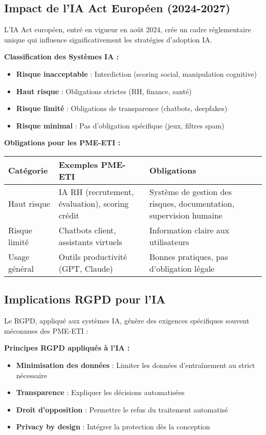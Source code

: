 \subsection{Impact de l'IA Act Européen (2024-2027)}

L'IA Act européen, entré en vigueur en août 2024, crée un cadre réglementaire unique qui influence significativement les stratégies d'adoption IA.

\textbf{Classification des Systèmes IA :}
\begin{itemize}
    \item \textbf{Risque inacceptable} : Interdiction (scoring social, manipulation cognitive)
    \item \textbf{Haut risque} : Obligations strictes (RH, finance, santé)
    \item \textbf{Risque limité} : Obligations de transparence (chatbots, deepfakes)
    \item \textbf{Risque minimal} : Pas d'obligation spécifique (jeux, filtres spam)
\end{itemize}

\textbf{Obligations pour les PME-ETI :}
\begin{longtable}{@{}p{3cm}p{5cm}p{6cm}@{}}
\toprule
\textbf{Catégorie} & \textbf{Exemples PME-ETI} & \textbf{Obligations} \\
\midrule
Haut risque & IA RH (recrutement, évaluation), scoring crédit & Système de gestion des risques, documentation, supervision humaine \\
Risque limité & Chatbots client, assistants virtuels & Information claire aux utilisateurs \\
Usage général & Outils productivité (GPT, Claude) & Bonnes pratiques, pas d'obligation légale \\
\bottomrule
\end{longtable}

\subsection{Implications RGPD pour l'IA}

Le RGPD, appliqué aux systèmes IA, génère des exigences spécifiques souvent méconnues des PME-ETI :

\textbf{Principes RGPD appliqués à l'IA :}
\begin{itemize}
    \item \textbf{Minimisation des données} : Limiter les données d'entraînement au strict nécessaire
    \item \textbf{Transparence} : Expliquer les décisions automatisées
    \item \textbf{Droit d'opposition} : Permettre le refus du traitement automatisé
    \item \textbf{Privacy by design} : Intégrer la protection dès la conception
\end{itemize}

